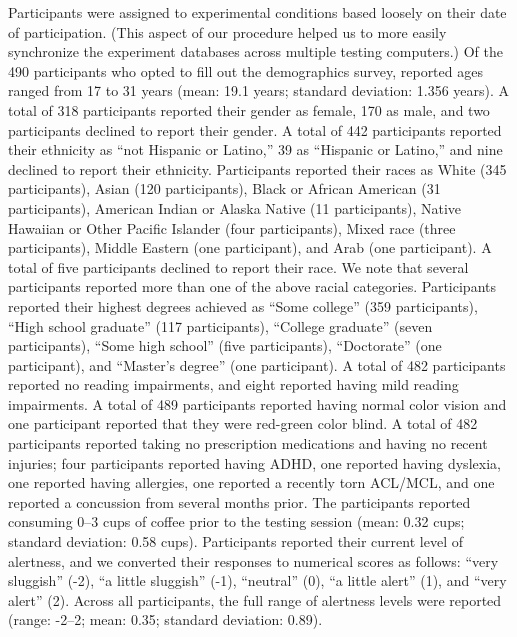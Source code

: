 \documentclass[11pt]{article}
\begin{document}
Participants were assigned to experimental conditions based loosely on their
date of participation. (This aspect of our procedure helped us to more easily
synchronize the experiment databases across multiple testing computers.) Of the
490 participants who opted to fill out the demographics survey, reported ages
ranged from 17 to 31 years (mean: 19.1 years; standard deviation: 1.356 years).
A total of 318 participants reported their gender as female, 170 as male, and
two participants declined to report their gender. A total of 442 participants
reported their ethnicity as ``not Hispanic or Latino,'' 39 as ``Hispanic or
Latino,'' and nine declined to report their ethnicity. Participants reported
their races as White (345 participants), Asian (120 participants), Black or
African American (31 participants), American Indian or Alaska Native (11
participants), Native Hawaiian or Other Pacific Islander (four participants),
Mixed race (three participants), Middle Eastern (one participant), and Arab
(one participant). A total of five participants declined to report their race.
We note that several participants reported more than one of the above racial
categories. Participants reported their highest degrees achieved as ``Some
college'' (359 participants), ``High school graduate'' (117 participants),
``College graduate'' (seven participants), ``Some high school'' (five
participants), ``Doctorate'' (one participant), and ``Master's degree'' (one
participant). A total of 482 participants reported no reading impairments, and
eight reported having mild reading impairments. A total of 489 participants
reported having normal color vision and one participant reported that they were
red-green color blind. A total of 482 participants reported taking no
prescription medications and having no recent injuries; four participants
reported having ADHD, one reported having dyslexia, one reported having
allergies, one reported a recently torn ACL/MCL, and one reported a concussion
from several months prior. The participants reported consuming 0--3 cups of
coffee prior to the testing session (mean: 0.32 cups; standard deviation: 0.58
cups). Participants reported their current level of alertness, and we converted
their responses to numerical scores as follows: ``very sluggish'' (-2), ``a
little sluggish'' (-1), ``neutral'' (0), ``a little alert'' (1), and ``very
alert'' (2). Across all participants, the full range of alertness levels were
reported (range: -2--2; mean: 0.35; standard deviation: 0.89).
\end{document}

